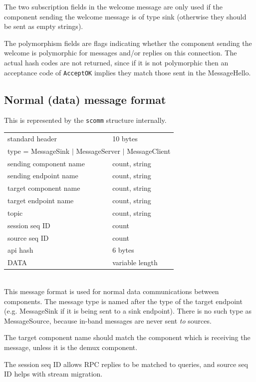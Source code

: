 \documentclass[12pt,a4paper,twoside]{article}
\renewcommand{\_}{\texttt{\symbol{95}}}
\begin{document}
The two subscription fields in the welcome message are only used if the
component sending the welcome message is of type sink (otherwise they
should be sent as empty strings).

The polymorphism fields are flags indicating whether the component
sending the welcome is polymorphic for messages and/or replies
on this connection. The actual hash codes are not returned, since
if it is not polymorphic then an acceptance code of \verb^AcceptOK^
implies they match those sent in the MessageHello.

\subsection{Normal (data) message format}

This is represented by the \verb^scomm^ structure internally.

\begin{tabular}{|ll|}
\hline
standard header    & 10 bytes\\
\multicolumn{2}{|c|}{type = MessageSink $|$ MessageServer $|$ MessageClient}\\
\hline
sending component name  & count, string\\
sending endpoint name  & count, string\\
target component name   & count, string\\
target endpoint name    & count, string\\
topic              & count, string\\
session seq ID     & count\\
source seq ID      & count\\
api hash           & 6 bytes\\
DATA               & variable length\\
\hline
\end{tabular}\\

This message format is used for normal data communications between
components. The message type is named after the type of the target
endpoint (e.g. MessageSink if it is being sent to a sink endpoint).
There is no such type as MessageSource, because in-band messages are
never sent \textit{to} sources.

The target component name should match the component which is
receiving the message, unless it is the demux component.

The session seq ID allows RPC replies to be matched to queries,
and source seq ID helps with stream migration.
\end{document}
